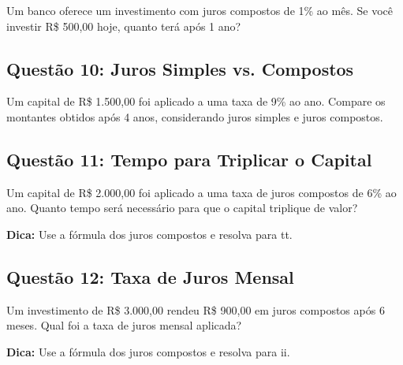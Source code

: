 \documentclass[11pt]{article}
\begin{document}
\begin{multicols}{2}
Um banco oferece um investimento com juros compostos de 1\% ao mês. Se você investir R\$ 500,00 hoje, quanto terá após 1 ano?

\subsection*{Questão 10: Juros Simples vs. Compostos}

Um capital de R\$ 1.500,00 foi aplicado a uma taxa de 9\% ao ano. Compare os montantes obtidos após 4 anos, considerando juros simples e juros compostos.

\subsection*{Questão 11: Tempo para Triplicar o Capital}
Um capital de R\$ 2.000,00 foi aplicado a uma taxa de juros compostos de 6\% ao ano. Quanto tempo será necessário para que o capital triplique de valor?

\textbf{Dica:} Use a fórmula dos juros compostos e resolva para tt.

\subsection*{Questão 12: Taxa de Juros Mensal}
Um investimento de R\$ 3.000,00 rendeu R\$ 900,00 em juros compostos após 6 meses. Qual foi a taxa de juros mensal aplicada?

\textbf{Dica:} Use a fórmula dos juros compostos e resolva para ii.

\end{multicols}
\end{document}
